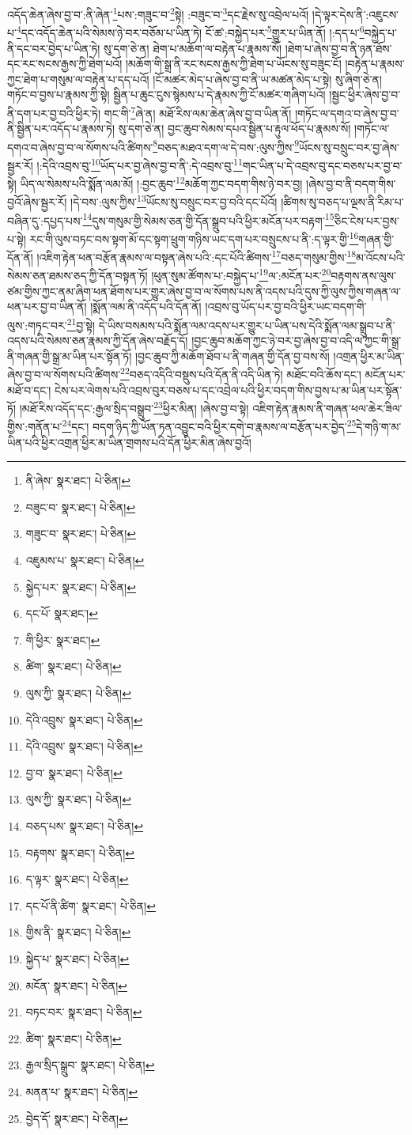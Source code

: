 འདོད་ཆེན་ཞེས་བྱ་བ་:ནི་ཞེན་\footnote{ནི་ཞེས་  སྣར་ཐང་།  པེ་ཅིན། }པས་:གཟུང་བ་\footnote{བཟུང་བ་  སྣར་ཐང་།  པེ་ཅིན། }སྟེ། :བཟུང་བ་\footnote{གཟུང་བ་  སྣར་ཐང་།  པེ་ཅིན། }དང་རྗེས་སུ་འབྲེལ་པའོ། །དེ་ལྟར་དེས་ནི་:འཇུངས་པ་\footnote{འཇུམས་པ་  སྣར་ཐང་།  པེ་ཅིན། }དང་འདོད་ཆེན་པའི་སེམས་ཉེ་བར་བཅོམ་པ་ཡིན་ཏེ། ངོ་ཚ་:བསྐྱེད་པར་\footnote{སྐྱེད་པར་  སྣར་ཐང་།  པེ་ཅིན། }གྱུར་པ་ཡིན་ནོ། །:དད་པ་\footnote{དང་པོ་  སྣར་ཐང་། }བསྐྱེད་པ་ནི་དང་བར་བྱེད་པ་ཡིན་ཏེ། སུ་དག་ཅེ་ན། ཐེག་པ་མཆོག་ལ་བརྟེན་པ་རྣམས་སོ། །ཐེག་པ་ཞེས་བྱ་བ་ནི་ཉན་ཐོས་དང་རང་སངས་རྒྱས་ཀྱི་ཐེག་པའོ། །མཆོག་གི་སྒྲ་ནི་རང་སངས་རྒྱས་ཀྱི་ཐེག་པ་ཡོངས་སུ་བཟུང་ངོ། །བརྟེན་པ་རྣམས་ཀྱང་ཐེག་པ་གསུམ་ལ་བརྟེན་པ་དད་པའོ། །ངོ་མཚར་མེད་པ་ཞེས་བྱ་བ་ནི་ཡ་མཚན་མེད་པ་སྟེ། སུ་ཞིག་ཅེ་ན། གཏོང་བ་བྱས་པ་རྣམས་ཀྱི་སྟེ། སྦྱིན་པ་ཆུང་ངུས་སྙེམས་པ་དེ་རྣམས་ཀྱི་ངོ་མཚར་གཞིག་པའོ། །སྦྱང་ཕྱིར་ཞེས་བྱ་བ་ནི་དག་པར་བྱ་བའི་ཕྱིར་ཏེ། གང་གི་\footnote{གི་ཕྱིར་  སྣར་ཐང་། }ཞེ་ན། མཐོ་རིས་ལམ་ཆེན་ཞེས་བྱ་བ་ཡིན་ནོ། །གཏོང་ལ་དགའ་བ་ཞེས་བྱ་བ་ནི་སྦྱིན་པར་འདོད་པ་རྣམས་ཏེ། སུ་དག་ཅེ་ན། བྱང་ཆུབ་སེམས་དཔའ་སྦྱིན་པ་རྟུལ་ཕོད་པ་རྣམས་སོ། །གཏོང་ལ་དགའ་བ་ཞེས་བྱ་བ་ལ་སོགས་པའི་ཚིགས་\footnote{ཚིག་  སྣར་ཐང་།  པེ་ཅིན། }བཅད་མཐའ་དག་ལ་དེ་བས་:ལུས་ཀྱིས་\footnote{ལུས་ཀྱི་  སྣར་ཐང་།  པེ་ཅིན། }ཡོངས་སུ་བསྲུང་བར་བྱ་ཞེས་སྦྱར་རོ། །:དེའི་འབྲས་བུ་\footnote{དེའི་འབྲུས་  སྣར་ཐང་།  པེ་ཅིན། }ཡོད་པར་བྱ་ཞེས་བྱ་བ་ནི་:དེ་འབྲས་བུ་\footnote{དེའི་འབྲུས་  སྣར་ཐང་།  པེ་ཅིན། }གང་ཡིན་པ་དེ་འབྲས་བུ་དང་བཅས་པར་བྱ་བ་སྟེ། ཡིད་ལ་སེམས་པའི་སྨོན་ལམ་མོ། །:བྱང་ཆུབ་\footnote{བྱ་བ་  སྣར་ཐང་།  པེ་ཅིན། }མཆོག་ཀྱང་བདག་གིས་ཉེ་བར་བྱ། །ཞེས་བྱ་བ་ནི་བདག་གིས་བྱའོ་ཞེས་སྦྱར་རོ། །དེ་བས་:ལུས་ཀྱིས་\footnote{ལུས་ཀྱི་  སྣར་ཐང་།  པེ་ཅིན། }ཡོངས་སུ་བསྲུང་བར་བྱ་བའི་དང་པོའོ། །ཚིགས་སུ་བཅད་པ་ལྔས་ནི་རིམ་པ་བཞིན་དུ་:དཔྱད་པས་\footnote{བཅད་པས་  སྣར་ཐང་།  པེ་ཅིན། }དུས་གསུམ་གྱི་སེམས་ཅན་གྱི་དོན་སྒྲུབ་པའི་ཕྱིར་མངོན་པར་བརྟག་\footnote{བརྟགས་  སྣར་ཐང་།  པེ་ཅིན། }ཅིང་ངེས་པར་བྱས་པ་སྟེ། རང་གི་ལུས་བཏང་བས་སྟག་མོ་དང་སྟག་ཕྲུག་གཉིས་ཡང་དག་པར་བསྲུངས་པ་ནི་:ད་ལྟར་གྱི་\footnote{ད་ལྟར་  སྣར་ཐང་།  པེ་ཅིན། }གཞན་གྱི་དོན་ནོ། །འཇིག་རྟེན་ཕན་བརྩོན་རྣམས་ལ་བསྟན་ཞེས་པའི་:དང་པོའི་ཚིགས་\footnote{དང་པོ་ནི་ཚིག་  སྣར་ཐང་།  པེ་ཅིན། }བཅད་གསུམ་གྱིས་\footnote{གྱིས་ནི་  སྣར་ཐང་།  པེ་ཅིན། }མ་འོངས་པའི་སེམས་ཅན་ཐམས་ཅད་ཀྱི་དོན་བསྟན་ཏོ། །ཕུན་སུམ་ཚོགས་པ་:བསྐྱེད་པ་\footnote{སྐྱེད་པ་  སྣར་ཐང་།  པེ་ཅིན། }ལ་:མངོན་པར་\footnote{མངོན་  སྣར་ཐང་།  པེ་ཅིན། }བརྟགས་ནས་ལུས་ཙམ་གྱིས་ཀྱང་ནམ་ཞིག་ཕན་ཐོགས་པར་གྱུར་ཞེས་བྱ་བ་ལ་སོགས་པས་ནི་འདས་པའི་དུས་ཀྱི་ལུས་ཀྱིས་གཞན་ལ་ཕན་པར་བྱ་བ་ཡིན་ནོ། །སྨོན་ལམ་ནི་འདོད་པའི་དོན་ནོ། །འབྲས་བུ་ཡོད་པར་བྱ་བའི་ཕྱིར་ཡང་བདག་གི་ལུས་:གཏང་བར་\footnote{བཏང་བར་  སྣར་ཐང་།  པེ་ཅིན། }བྱ་སྟེ། དེ་ཡིས་བསམས་པའི་སྨོན་ལམ་འདས་པར་གྱུར་པ་ཡིན་པས་དེའི་སྨོན་ལམ་སྒྲུབ་པ་ནི་འདས་པའི་སེམས་ཅན་རྣམས་ཀྱི་དོན་ཞེས་བརྗོད་དོ། །བྱང་ཆུབ་མཆོག་ཀྱང་ཉེ་བར་བྱ་ཞེས་བྱ་བ་འདི་ལ་ཀྱང་གི་སྒྲ་ནི་གཞན་གྱི་སྒྲ་མ་ཡིན་པར་སྟོན་ཏོ། །བྱང་ཆུབ་ཀྱི་མཆོག་ཐོབ་པ་ནི་གཞན་གྱི་དོན་བྱ་བས་སོ། །འགྲན་ཕྱིར་མ་ཡིན་ཞེས་བྱ་བ་ལ་སོགས་པའི་ཚིགས་\footnote{ཚིག་  སྣར་ཐང་།  པེ་ཅིན། }བཅད་འདིའི་བསྡུས་པའི་དོན་ནི་འདི་ཡིན་ཏེ། མཐོང་བའི་ཆོས་དང་། མངོན་པར་མཐོ་བ་དང་། ངེས་པར་ལེགས་པའི་འབྲས་བུར་བཅས་པ་དང་འབྲེལ་པའི་ཕྱིར་བདག་གིས་བྱས་པ་མ་ཡིན་པར་སྟོན་ཏོ། །མཐོ་རིས་འདོད་དང་:རྒྱལ་སྲིད་བསྒྲུབ་\footnote{རྒྱལ་སྲིད་སྒྲུབ་  སྣར་ཐང་།  པེ་ཅིན། }ཕྱིར་མིན། །ཞེས་བྱ་བ་སྟེ། འཇིག་རྟེན་རྣམས་ནི་གཞན་ཕལ་ཆེར་ཟིལ་གྱིས་:གནོན་པ་\footnote{མནན་པ་  སྣར་ཐང་།  པེ་ཅིན། }དང་། བདག་ཉིད་ཀྱི་ཡོན་ཏན་འབྱུང་བའི་ཕྱིར་དགེ་བ་རྣམས་ལ་བརྩོན་པར་བྱེད་\footnote{བྱེད་དོ་  སྣར་ཐང་།  པེ་ཅིན། }དེ་གཉི་ག་མ་ཡིན་པའི་ཕྱིར་འགྲན་ཕྱིར་མ་ཡིན་གྲགས་པའི་དོན་ཕྱིར་མིན་ཞེས་བྱའོ། 